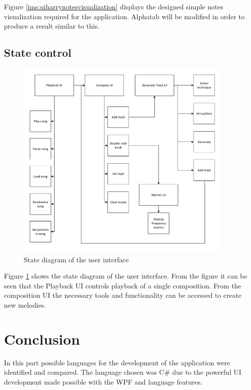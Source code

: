Figure \ref{ims:uiharrynotesvisualization} displays the designed simple notes visualization required for the application. Alphatab will be modified in order to produce a result similar to this.





\section{State control}

\begin{figure}
\centerline{\includegraphics[width=400px]{../images/ui_control_blockdiagram.pdf}}
\caption{State diagram of the user interface}
\label{ims:uiflow}
\end{figure}

Figure \ref{ims:uiflow} shows the state diagram of the user interface. 
From the figure it can be seen that the Playback UI controls playback of a single composition. From the composition UI the necessary tools and functionality can be accessed to create new melodies.


\chapter{Conclusion}
In this part possible languages for the development of the application were identified and compared. The language chosen was C\# due to the powerful \ac{UI} development made possible with the \ac{WPF} and language features. 

